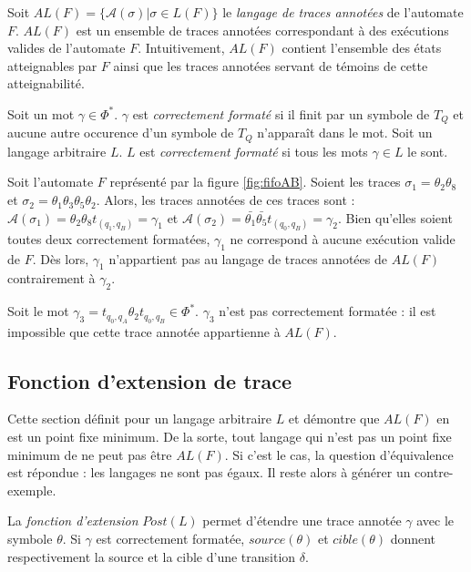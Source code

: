 Soit $AL(F)=\{\mathcal{A}(\sigma)|\sigma \in L(F)\}$ le \emph{langage de traces annotées} de l'automate $F$. $AL(F)$ est un ensemble de traces annotées correspondant à des exécutions valides de l'automate $F$. Intuitivement, $AL(F)$ contient l'ensemble des états atteignables par $F$ ainsi que les traces annotées servant de témoins de cette atteignabilité.

Soit un mot $\gamma \in \Phi^*$. $\gamma$ est \emph{correctement formaté} si il finit par un symbole de $T_Q$ et aucune autre occurence d'un symbole de $T_Q$ n'apparaît dans le mot. Soit un langage arbitraire $L$. $L$ est \emph{correctement formaté} si tous les mots $\gamma\in L$ le sont.


\begin{example}
Soit l'automate $F$ représenté par la figure \ref{fig:fifoAB}. Soient les traces $\sigma_1=\theta_2\theta_8$ et $\sigma_2=\theta_1\theta_3\theta_5\theta_2$. Alors, les traces annotées de ces traces sont : $\mathcal{A}(\sigma_1)=\theta_2\theta_8t_{(q_1,q_B)}=\gamma_1$ et $\mathcal{A}(\sigma_2)=\bar{\theta_1}\bar{\theta_5}t_{(q_0,q_B)}=\gamma_2$.
Bien qu'elles soient toutes deux correctement formatées, $\gamma_1$ ne correspond à aucune exécution valide de $F$. Dès lors, $\gamma_1$ n'appartient pas au langage de traces annotées de $AL(F)$ contrairement à $\gamma_2$.

Soit le mot $\gamma_3=t_{q_0,q_A}\theta_2 t_{q_0,q_B} \in \Phi^*$. $\gamma_3$ n'est pas correctement formatée : il est impossible que cette trace annotée appartienne à $AL(F)$.
\end{example}


\subsection{Fonction d'extension de trace}\label{ss:extension}

Cette section définit \fl pour un langage arbitraire $L$ et démontre que $AL(F)$ en est un point fixe minimum. De la sorte, tout langage qui n'est pas un point fixe minimum de \fl ne peut pas être $AL(F)$. Si c'est le cas, la question d'équivalence est répondue : les langages ne sont pas égaux. Il reste alors à générer un contre-exemple.

La \emph{fonction d'extension} $Post(L)$ permet d'étendre une trace annotée $\gamma$ avec le symbole $\theta$. Si $\gamma$ est correctement formatée, $source(\theta)$ et $cible(\theta)$ donnent respectivement la source et la cible d'une transition $\delta$.

